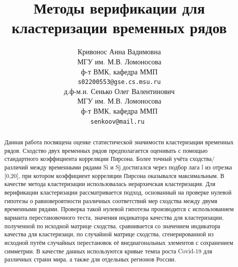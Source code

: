 \documentclass{article}
\title{Методы верификации для кластеризации временных рядов }
\author{ Кривонос Анна Вадимовна  \\
	МГУ им. М.В. Ломоносова\\
	ф-т ВМК, кафедра ММП\\
	\texttt{s02200553@gse.cs.msu.ru} \\
	\And
	д.ф-м.н. Сенько Олег Валентинович \\
	МГУ им. М.В. Ломоносова\\
	ф-т ВМК, кафедра ММП\\
	\texttt{senkoov@mail.ru } \\
}
\date{}
\begin{document}
\maketitle

\begin{abstract}
	Данная работа посвящена оценке статистической значимости кластеризации временных рядов. Сходство двух временных рядов  предполагается оценивать с помощью стандартного коэффициента корреляции Пирсона. Более точный учёта сходства/различий между
    временными рядами Si и Sj достигался через подбор лага l из отрезка [0,20], при котором коэффициент корреляции Пирсона оказывался максимальным. В качестве метода кластеризации использовалась иерархичская кластеризация. Для верификации кластеризации рассматривается подход, основанный на проверке нулевой гипотезы о равновероятности различных соответствий мер сходства между двумя временными рядами. Проверка такой нулевой гипотезы производится с использованием варианта перестановочного теста, значения индикатора качества для кластеризации, полученной по исходной матрице сходства, сравнивается со значением индикатора качества для кластеризаци, по случайной матрице сходства, сгенерированной из исходной путём случайных перестановок её внедиагональных элементов с сохранением симметрии. В качестве данных используются кривые темпа роста Covid-19 для различных странн мира, а также для отдельных регионов России.
\end{abstract}


\end{document}
